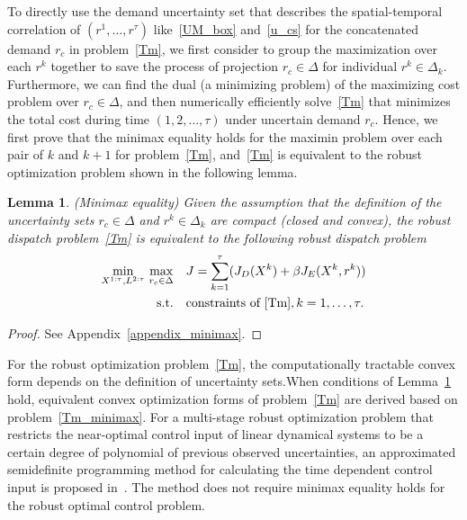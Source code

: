 \documentclass[10pt,twocolumn,twoside,english]{IEEEtran}
\newtheorem{lemma}{Lemma}
\begin{document}
To directly use the demand uncertainty set that describes the spatial-temporal correlation of $(r^1, \dots, r^{\tau})$ like~\eqref{UM_box} and~\eqref{u_cs} for the concatenated demand $r_c$ in problem~\eqref{Tm}, we first consider to group the maximization over each $r^k$ together to save the process of projection $r_c \in \Delta$ for individual $r^k \in \Delta_k$. Furthermore, we can find the dual (a minimizing problem) of the maximizing cost problem over $r_c \in \Delta$, and then numerically efficiently solve~\eqref{Tm} that minimizes the total cost during time $(1,2,\dots, \tau)$ under uncertain demand $r_c$. Hence, we first prove that the minimax equality holds for the maximin problem over each pair of $k$ and $k+1$ for problem~\eqref{Tm}, and~\eqref{Tm} is equivalent to the robust optimization problem shown in the following lemma. \begin{lemma}(Minimax equality)
Given the assumption that the definition of the uncertainty sets $r_c \in \Delta$ and $r^k\in \Delta_k$ are compact (closed and convex), the robust dispatch problem~\eqref{Tm} is equivalent to the following robust dispatch problem
\begin{align}
\begin{split}
\underset{X^{1:\tau}, L^{2:\tau}}{\text{min}}\ \underset{r_c\in \Delta}{\text{max}}\quad &J =\sum_{k=1}^{\tau} (J_D(X^k)+\beta J_E(X^k,r^k))\\
\text{s.t.}\quad &\text{constraints of~\eqref{Tm}}, k=1,\dots, \tau.
\end{split}
\label{Tm_minimax}
\end{align}
\label{lemma_minimax}
\end{lemma}
\begin{proof}
See Appendix~\ref{appendix_minimax}.
\end{proof}

For the robust optimization problem~\eqref{Tm}, the computationally tractable convex form depends on the definition of uncertainty sets.When conditions of Lemma~\ref{lemma_minimax} hold, equivalent convex optimization forms of problem~\eqref{Tm} are derived based on problem~\eqref{Tm_minimax}. For a multi-stage robust optimization problem that restricts the near-optimal control input of linear dynamical systems to be a certain degree of polynomial of previous observed uncertainties, an approximated semidefinite programming method for calculating the time dependent control input is proposed in~\cite{multistage}. The method does not require minimax equality holds for the robust optimal control problem.
\end{document}
